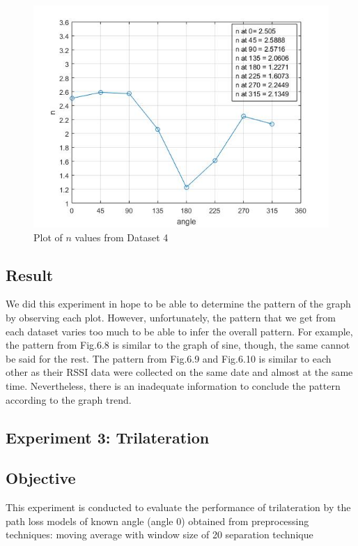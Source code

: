 \begin{figure}[H]
\centering
\includegraphics[width=\textwidth]{Image/pltN4.jpg}
\caption{Plot of $n$ values from Dataset 4}
\label{}
\end{figure}

\subsection*{Result}
We did this experiment in hope to be able to determine the pattern of the graph by observing each plot. However, unfortunately, the pattern that we get from each dataset varies too much to be able to infer the overall pattern. For example, the pattern from Fig.6.8 is similar to the graph of sine, though, the same cannot be said for the rest. The pattern from Fig.6.9 and Fig.6.10 is similar to each other as their RSSI data were collected on the same date and almost at the same time. Nevertheless, there is an inadequate information to conclude the pattern according to the graph trend.

\subsection{Experiment 3: Trilateration}
\subsection*{Objective}
This experiment is conducted to evaluate the performance of trilateration by the
path loss models of known angle (angle 0) obtained from preprocessing techniques: moving average with window size of 20
separation technique
